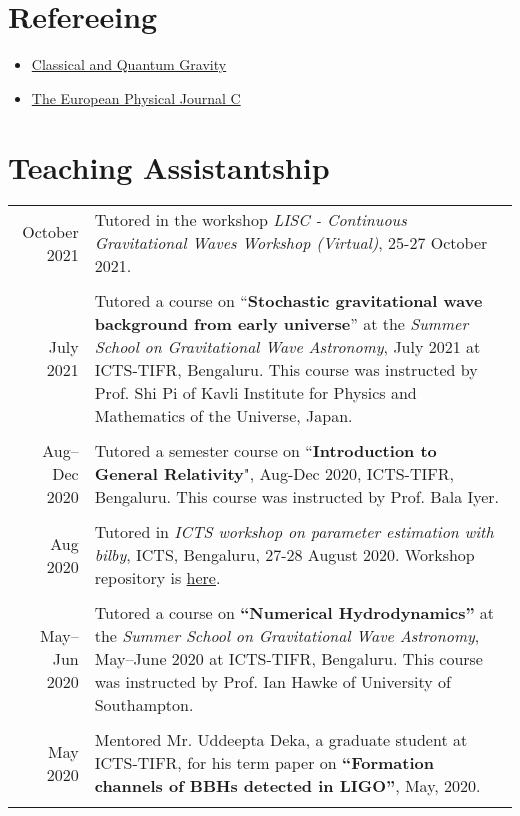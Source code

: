 \documentclass[12pt]{article}
\begin{document}
\section{Refereeing}
\begin{itemize}
\item \href{https://iopscience.iop.org/journal/0264-9381}{Classical and Quantum Gravity}
\item \href{https://epjc.epj.org/}{The European Physical Journal C}
\end{itemize}


\section{Teaching Assistantship}
\begin{longtable}{rp{14cm}}
  October 2021 & Tutored in the workshop {\itshape LISC - Continuous Gravitational Waves Workshop (Virtual)}, 25-27 October 2021.\\\\
  July 2021 & {Tutored} a course on ``{\bfseries Stochastic gravitational wave background from early universe}'' at the {\itshape Summer School on Gravitational Wave Astronomy}, July 2021 at ICTS-TIFR, Bengaluru. This course was instructed by Prof. Shi Pi of Kavli Institute for Physics and Mathematics of the Universe, Japan.\\\\
  Aug--Dec 2020 & {Tutored} a semester course on ``{\bfseries Introduction to General Relativity}", Aug-Dec 2020, ICTS-TIFR, Bengaluru. This course was instructed by Prof. Bala Iyer.\\\\
  
  Aug 2020 & {Tutored} in {\itshape ICTS workshop on parameter estimation with bilby}, ICTS, Bengaluru, 27-28 August 2020. Workshop repository is \href{https://github.com/GregoryAshton/GWParameterEstimationWorkshop2020}{here}.\\\\
  
  May--Jun 2020 & {Tutored} a course on {\bfseries ``Numerical Hydrodynamics''} at the {\itshape Summer School on Gravitational Wave Astronomy}, May--June 2020 at ICTS-TIFR, Bengaluru. This course was instructed by Prof. Ian Hawke of University of Southampton.\\\\
  
  May 2020 & {Mentored} Mr. Uddeepta Deka, a graduate student at ICTS-TIFR, for his term paper on {\bfseries ``Formation channels of BBHs detected in LIGO''}, May, 2020.\\\\
  

\end{longtable}
\end{document}
